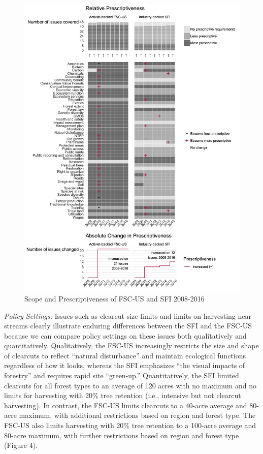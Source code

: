 \documentclass[
      12pt,
            Review ]{article}
\begin{document}
\begin{figure}
\centering
\includegraphics{FSC-SFI-1.png}
\caption{Scope and Prescriptiveness of FSC-US and SFI 2008-2016}
\end{figure}

\emph{Policy Settings:} Issues such as clearcut size limits and limits on harvesting near streams clearly illustrate enduring differences between the SFI and the FSC-US because we can compare policy settings on these issues both qualitatively and quantitatively. Qualitatively, the FSC-US increasingly restricts the size and shape of clearcuts to reflect ``natural disturbance'' and maintain ecological functions regardless of how it looks, whereas the SFI emphasizes ``the visual impacts of forestry'' and requires rapid site ``green-up.'' Quantitatively, the SFI limited clearcuts for all forest types to an average of 120 acres with no maximum and no limits for harvesting with 20\% tree retention (i.e., intensive but not clearcut harvesting). In contrast, the FSC-US limits clearcuts to a 40-acre average and 80-acre maximum, with additional restrictions based on region and forest type. The FSC-US also limits harvesting with 20\% tree retention to a 100-acre average and 80-acre maximum, with further restrictions based on region and forest type (Figure 4).
\end{document}
